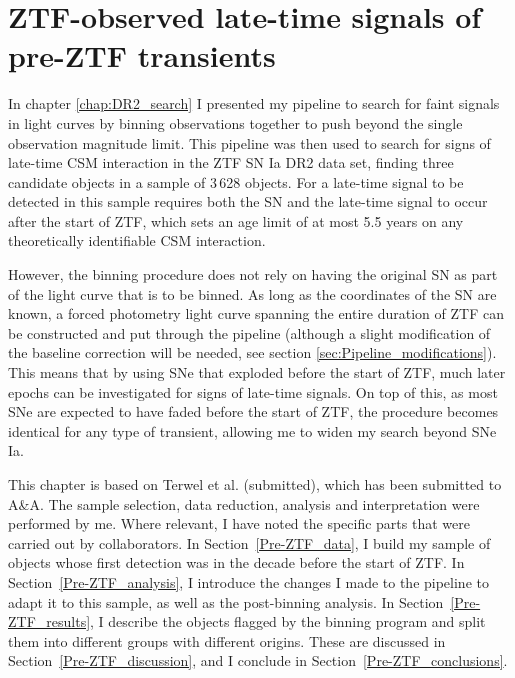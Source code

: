 \documentclass[a4paper,oneside,12pt, class=Latex/Classes/PhDthesisPSnPDF, crop=false]{standalone}
\begin{document}
\doublespacing
\chapter{ZTF-observed late-time signals of pre-ZTF transients}
\label{chap:pre-ZTF_search}

In chapter \ref{chap:DR2_search} I presented my pipeline to search for faint signals in light curves by binning observations together to push beyond the single observation magnitude limit. This pipeline was then used to search for signs of late-time CSM interaction in the ZTF SN Ia DR2 data set, finding three candidate objects in a sample of 3\,628 objects. For a late-time signal to be detected in this sample requires both the SN and the late-time signal to occur after the start of ZTF, which sets an age limit of at most 5.5 years on any theoretically identifiable CSM interaction.

However, the binning procedure does not rely on having the original SN as part of the light curve that is to be binned. As long as the coordinates of the SN are known, a forced photometry light curve spanning the entire duration of ZTF can be constructed and put through the pipeline (although a slight modification of the baseline correction will be needed, see section \ref{sec:Pipeline_modifications}). This means that by using SNe that exploded before the start of ZTF, much later epochs can be investigated for signs of late-time signals. On top of this, as most SNe are expected to have faded before the start of ZTF, the procedure becomes identical for any type of transient, allowing me to widen my search beyond SNe Ia.

This chapter is based on Terwel et al. (submitted), which has been submitted to A\&A. The sample selection, data reduction, analysis and interpretation were performed by me. Where relevant, I have noted the specific parts that were carried out by collaborators. In Section~\ref{Pre-ZTF_data}, I build my sample of objects whose first detection was in the decade before the start of ZTF. In Section~\ref{Pre-ZTF_analysis}, I introduce the changes I made to the pipeline to adapt it to this sample, as well as the post-binning analysis. In Section~\ref{Pre-ZTF_results}, I describe the objects flagged by the binning program and split them into different groups with different origins. These are discussed in Section~\ref{Pre-ZTF_discussion}, and I conclude in Section~\ref{Pre-ZTF_conclusions}.
\end{document}
